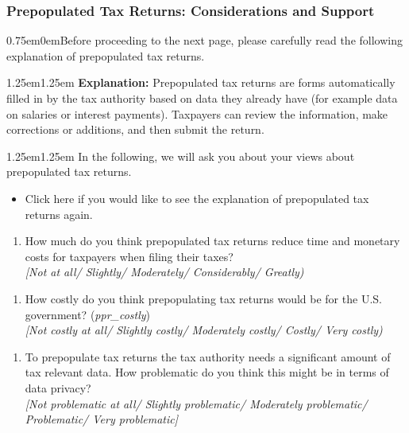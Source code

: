 \documentclass[11pt]{article}
\begin{document}
\subsubsection*{Prepopulated Tax Returns: Considerations and Support} 
\vspace{0.5em}
\begin{adjustwidth}{0.75em}{0em}Before proceeding to the next page, please carefully read the following explanation of prepopulated tax returns.\end{adjustwidth}
\vspace{0.5em}
\begin{adjustwidth}{1.25em}{1.25em} \textbf{Explanation:} Prepopulated tax returns are forms automatically filled in by the tax authority based on data they already have (for example data on salaries or interest payments). Taxpayers can review the information, make corrections or additions, and then submit the return.
\end{adjustwidth}
\begin{adjustwidth}{1.25em}{1.25em} In the following, we will ask you about your views about prepopulated tax returns. 
\end{adjustwidth}
\begin{itemize}
    \item[$\rightarrow$] Click here if you would like to see the explanation of prepopulated tax returns again.
\end{itemize}
\begin{enumerate}[resume]
    \item How much do you think prepopulated tax returns reduce time and monetary costs for taxpayers when filing their taxes? \\
    \textit{[Not at all/ Slightly/ Moderately/ Considerably/ Greatly)}
\end{enumerate}
\begin{enumerate}[resume]
     \item How costly do you think prepopulating tax returns would be for the U.S. government? (\textit{ppr\_costly}) \\
    \textit{[Not costly at all/ Slightly costly/ Moderately costly/ Costly/ Very costly)} 
\end{enumerate}
\begin{enumerate}[resume]
     \item To prepopulate tax returns the tax authority needs a significant amount of tax relevant data. How problematic do you think this might be in terms of data privacy?\\ 
     \textit{[Not problematic at all/ Slightly problematic/ Moderately problematic/ Problematic/ Very problematic]} 
\end{enumerate}
\end{document}
